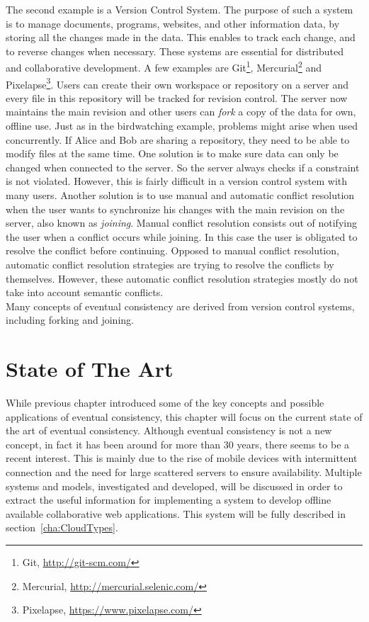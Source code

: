 \documentclass[a4paper,12pt]{report}
\begin{document}
The second example is a Version Control System. The purpose of such a system is to manage documents, programs, websites, and other information data, by storing all the changes made in the data. This enables to track each change, and to reverse changes when necessary. These systems are essential for distributed and collaborative development. A few examples are Git\footnote{Git, \url{http://git-scm.com/}}, Mercurial\footnote{Mercurial, \url{http://mercurial.selenic.com/}} and Pixelapse\footnote{Pixelapse, \url{https://www.pixelapse.com/}}. Users can create their own workspace or repository on a server and every file in this repository will be tracked for revision control. The server now maintains the main revision and other users can \textit{fork} a copy of the data for own, offline use. Just as in the birdwatching example, problems might arise when used concurrently. If Alice and Bob are sharing a repository, they need to be able to modify files at the same time. One solution is to make sure data can only be changed when connected to the server. So the server always checks if a constraint is not violated. However, this is fairly difficult in a version control system with many users. Another solution is to use manual and automatic conflict resolution when the user wants to synchronize his changes with the main revision on the server, also known as \textit{joining}. Manual conflict resolution consists out of notifying the user when a conflict occurs while joining. In this case the user is obligated to resolve the conflict before continuing. Opposed to manual conflict resolution, automatic conflict resolution strategies are trying to resolve the conflicts by themselves. However, these automatic conflict resolution strategies mostly do not take into account semantic conflicts. \\
Many concepts of eventual consistency are derived from version control systems, including forking and joining.

\chapter{State of The Art}\label{cha:StateOfTheArt} %

While previous chapter introduced some of the key concepts and possible applications of eventual consistency, this chapter will focus on the current state of the art of eventual consistency. Although eventual consistency is not a new concept, in fact it has been around for more than 30 years, there seems to be a recent interest. This is mainly due to the rise of mobile devices with intermittent connection and the need for large scattered servers to ensure availability. Multiple systems and models, investigated and developed, will be discussed in order to extract the useful information for implementing a system to develop offline available collaborative web applications. This system will be fully described in section~\ref{cha:CloudTypes}. 
\end{document}
